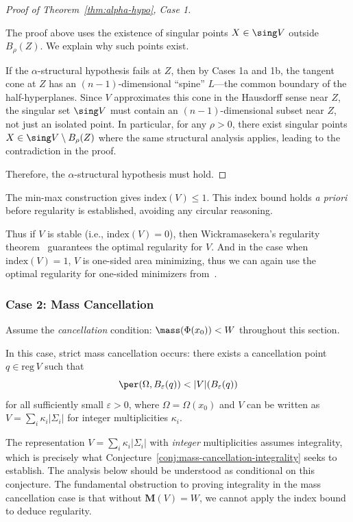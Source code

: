 \begin{proof}[Proof of Theorem~\ref{thm:alpha-hypo}, Case 1]
\begin{remark}\label{rem:sing-dimension}
The proof above uses the existence of singular points $X \in \sing V$ outside $B_\rho(Z)$. We explain why such points exist.

If the $\alpha$-structural hypothesis fails at $Z$, then by Cases 1a and 1b, the tangent cone at $Z$ has an $(n-1)$-dimensional ``spine'' $L$---the common boundary of the half-hyperplanes. Since $V$ approximates this cone in the Hausdorff sense near $Z$, the singular set $\sing V$ must contain an $(n-1)$-dimensional subset near $Z$, not just an isolated point. In particular, for any $\rho > 0$, there exist singular points $X \in \sing V \setminus B_\rho(Z)$ where the same structural analysis applies, leading to the contradiction in the proof.
\end{remark}

Therefore, the $\alpha$-structural hypothesis must hold.
\end{proof}

The min-max construction gives $\text{index}(V) \leq 1$. This index bound holds \emph{a priori} before regularity is established, avoiding any circular reasoning.

Thus if $V$ is stable (i.e., $\mathrm{index}(V) = 0$), then
Wickramasekera's regularity theorem~\cite{Wic14} guarantees the optimal regularity for $V$. And in the case when
$\text{index}(V) = 1$, $V$ is one-sided area minimizing, thus we can again use the optimal regularity for one-sided
minimizers from~\cite{Liu19}.

\subsubsection{Case 2: Mass Cancellation}

Assume the \emph{cancellation} condition: $\mass(\Phi(x_0)) < W$ throughout this section.

In this case, strict mass cancellation occurs: there exists a cancellation point $q \in \text{reg}\, V$ such that
\[
    \per(\Omega, B_\varepsilon(q)) < |V|(B_\varepsilon(q))
\]
for all sufficiently small $\varepsilon > 0$, where $\Omega = \Omega(x_0)$ and $V$ can be written as
$V = \sum_i\kappa_i|\Sigma_i|$ for integer multiplicities $\kappa_i$.

\begin{remark}
The representation $V = \sum_i\kappa_i|\Sigma_i|$ with \emph{integer} multiplicities assumes integrality, which is precisely what Conjecture~\ref{conj:mass-cancellation-integrality} seeks to establish. The analysis below should be understood as conditional on this conjecture. The fundamental obstruction to proving integrality in the mass cancellation case is that without $\mathbf{M}(V) = W$, we cannot apply the index bound to deduce regularity.
\end{remark}

